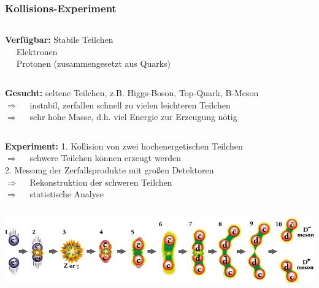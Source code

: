 \documentclass[10pt,t]{beamer}
\begin{document}
\begin{frame}
\frametitle{Kollisions-Experiment}
\vspace*{-2\baselineskip}
\begin{columns}
\textbf{Verfügbar:}
Stabile Teilchen \\
    \qquad\textbullet~~ Elektronen \\
    \qquad\textbullet~~ Protonen (zusammengesetzt aus Quarks)
\end{columns}
\vspace*{1ex}
\begin{columns}
\textbf{Gesucht:}
seltene Teilchen, z.B. Higgs-Boson, Top-Quark, B-Meson \\
    \qquad$\Rightarrow$~~ instabil, zerfallen schnell zu vielen leichteren Teilchen \\
    \qquad$\Rightarrow$~~ sehr hohe Masse, d.h. viel Energie zur Erzeugung nötig
\end{columns}
\vspace*{1ex}
\begin{columns}
\textbf{Experiment:}
1. Kollision von zwei hochenergetischen Teilchen \\
    \qquad$\Rightarrow$~~ schwere Teilchen können erzeugt werden \\[1ex]
    2. Messung der Zerfallsprodukte mit großen Detektoren \\
    \qquad$\Rightarrow$~~ Rekonstruktion der schweren Teilchen \\
    \qquad$\Rightarrow$~~ statistische Analyse
\end{columns}
\vspace*{1ex}
\includegraphics[width=\textwidth]{teilchenphysik-kollision}
\end{frame}
\end{document}
